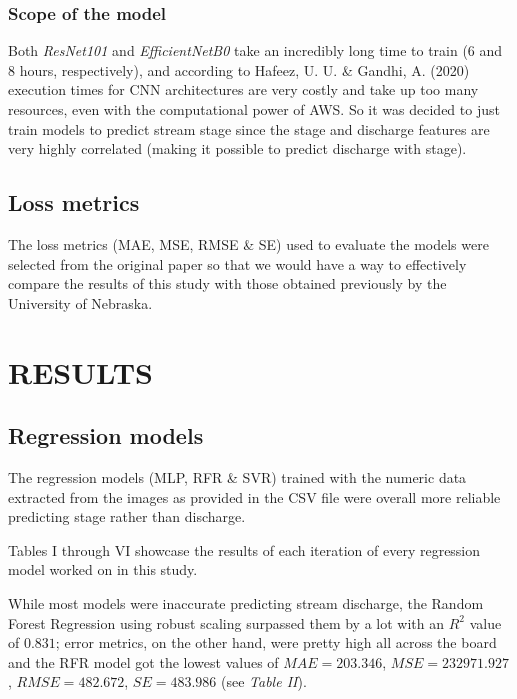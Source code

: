 \documentclass[conference]{IEEEtran}
\begin{document}
\subsubsection{Scope of the model}
Both \textit{ResNet101} and \textit{EfficientNetB0} take an incredibly long time to train (6 and 8 hours, respectively), and according to Hafeez, U. U. \& Gandhi, A. (2020) \cite{compute-times} execution times for CNN architectures are very costly and take up too many resources, even with the computational power of AWS. So it was decided to just train models to predict stream stage since the stage and discharge features are very highly correlated (making it possible to predict discharge with stage).

\subsection{\textbf{Loss metrics}}
The loss metrics (MAE, MSE, RMSE \& SE) used to evaluate the models were selected from the original paper so that we would have a way to effectively compare the results of this study with those obtained previously by the University of Nebraska.

\section{RESULTS}
\subsection{\textbf{Regression models}}
The regression models (MLP, RFR \& SVR) trained with the numeric data extracted from the images as provided in the CSV file were overall more reliable predicting stage rather than discharge.

Tables I through VI showcase the results of each iteration of every regression model worked on in this study.

While most models were inaccurate predicting stream discharge, the Random Forest Regression using robust scaling surpassed them by a lot with an $R^2$ value of $0.831$; error metrics, on the other hand, were pretty high all across the board and the RFR model got the lowest values of $MAE = 203.346$, $MSE = 232971.927$, $RMSE = 482.672$, $SE = 483.986$ (see \textit{Table II}).
\end{document}
